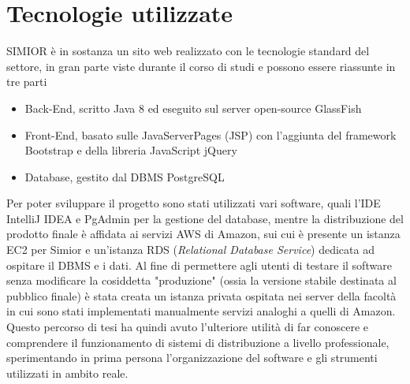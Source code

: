 \section{Tecnologie utilizzate}
SIMIOR è in sostanza un sito web realizzato con le tecnologie standard del settore, in gran parte viste durante il corso di studi e possono essere riassunte in tre parti
\begin{itemize}
	\item Back-End, scritto Java 8 ed eseguito sul server open-source GlassFish
	\item Front-End, basato sulle JavaServerPages (JSP) con l'aggiunta del framework Bootstrap e della libreria JavaScript jQuery
	\item Database, gestito dal DBMS PostgreSQL
\end{itemize}
Per poter sviluppare il progetto sono stati utilizzati vari software, quali l'IDE IntelliJ IDEA e PgAdmin per la gestione del database,
mentre la distribuzione del prodotto finale è affidata ai servizi AWS di Amazon, sui cui è presente un istanza EC2 per Simior e un'istanza RDS (\textit{Relational Database Service}) dedicata ad ospitare il DBMS e i dati.
Al fine di permettere agli utenti di testare il software senza modificare la cosiddetta "produzione" (ossia la versione stabile destinata al pubblico finale) è stata creata un istanza privata ospitata nei server della facoltà in cui sono stati implementati manualmente servizi analoghi a quelli di Amazon.
Questo percorso di tesi ha quindi avuto l'ulteriore utilità di far conoscere e comprendere il funzionamento di sistemi di distribuzione a livello professionale, sperimentando in prima persona l'organizzazione del software e gli strumenti utilizzati in ambito reale.




%
%


